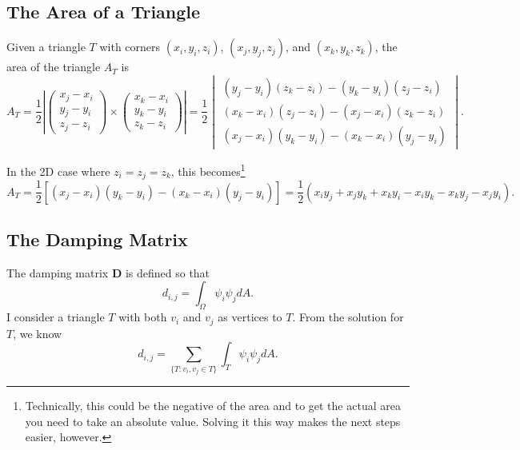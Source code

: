 \subsection{The Area of a Triangle}

Given a triangle $T$ with corners $(x_i, y_i, z_i)$, $(x_j, y_j, z_j)$, and $(x_k, y_k, z_k)$, the area of the triangle $A_T$ is
\[
    A_T = \frac{1}{2} \left| \begin{pmatrix}
        x_j - x_i \\ y_j - y_i \\ z_j - z_i
    \end{pmatrix} \times \begin{pmatrix}
        x_k - x_i \\ y_k - y_i \\ z_k - z_i
    \end{pmatrix} \right| = \frac{1}{2} \begin{vmatrix}
        (y_j - y_i)(z_k - z_i) - (y_k - y_i)(z_j - z_i) \\
        (x_k - x_i)(z_j - z_i) - (x_j - x_i)(z_k - z_i) \\
        (x_j - x_i)(y_k - y_i) - (x_k - x_i)(y_j - y_i)
    \end{vmatrix}.
\]

In the 2D case where $z_i = z_j = z_k$, this becomes\footnote{Technically, this could be the negative of the area and to get the actual area you need to take an absolute value. Solving it this way makes the next steps easier, however.}
\[
    A_T = \frac{1}{2} \left[(x_j - x_i)(y_k - y_i) - (x_k - x_i)(y_j - y_i)\right] = \frac{1}{2} \left(x_i y_j + x_j y_k + x_k y_i - x_i y_k - x_k y_j - x_j y_i\right).
\]

\subsection{The Damping Matrix}

The damping matrix $\mathbf{D}$ is defined so that
\[
    d_{i, j} = \int_\Omega \psi_i \psi_j dA.
\]
I consider a triangle $T$ with both $v_i$ and $v_j$ as vertices to $T$. From the solution for $T$, we know
\[
    d_{i, j} = \sum_{\{T: v_i, v_j \in T\}} \int_T \psi_i \psi_j dA.
\]

